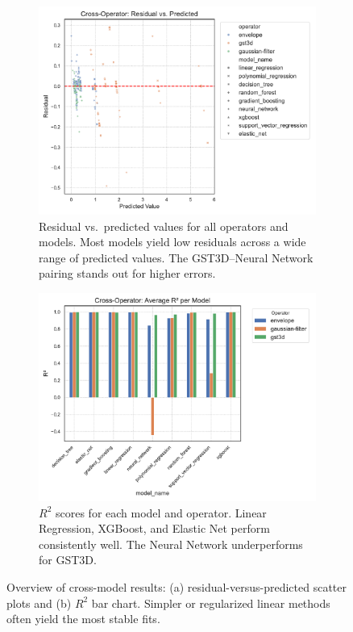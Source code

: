 \begin{figure}[htbp]
    \centering
    \begin{subfigure}[t]{0.49\textwidth}
        \centering
        \includegraphics[width=\textwidth]{assets/images/05/residual_vs_predicted}
        \caption{Residual vs.\ predicted values for all operators and models.
        Most models yield low residuals across a wide range of predicted values.
        The \ac{GST3D}–Neural Network pairing stands out for higher errors.}
    \end{subfigure}
    \hfill
    \begin{subfigure}[t]{0.49\textwidth}
        \centering
        \includegraphics[width=\textwidth]{assets/images/05/cross_model_r2_bar}
        \caption{$R^2$ scores for each model and operator.
        Linear Regression, XGBoost, and Elastic Net perform consistently well.
        The Neural Network underperforms for \ac{GST3D}.}
    \end{subfigure}
    \caption{Overview of cross-model results: (a) residual-versus-predicted scatter plots and (b) $R^2$ bar chart.
    Simpler or regularized linear methods often yield the most stable fits.}
    \label{fig:residual_vs_predicted_and_r2_bar}
\end{figure}

